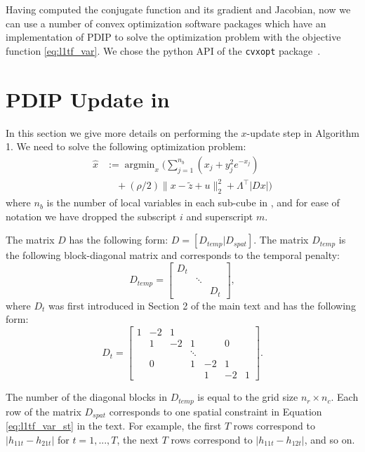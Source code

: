 \documentclass[letterpaper]{article} %
\newcommand{\citep}{\cite}
\DeclareMathOperator*{\argmin}{argmin}
\newcommand{\autoref}{\Cref}
\begin{document}
Having computed the conjugate function and its gradient and Jacobian,
now we can use a number of convex optimization software packages which
have an implementation of PDIP to solve the optimization problem with
the objective function \eqref{eq:l1tf_var}. We chose the python API of
the \texttt{cvxopt} package~\citep{andersen_cvxopt:_2013}. 




\section{PDIP Update in~\autoref{alg:conADMM}}
\label{sec:app_consADMM}

In this section we give more details on performing the $x$-update step in Algorithm 1. We need to solve the following optimization problem:
\begin{align}
\hat{x} &:=\argmin_{x} \bigg( \sum_{j=1}^{n_b} (x_j +
                y_j^2e^{-x_j})\\
  &\quad+ (\rho/2) \lVert x-\tilde{z} + u \lVert_2^2 + \Lambda^\top |D x| \bigg)
\label{eq:x_update_opt}
\end{align}
where $n_b$ is the number of local variables in each sub-cube in \autoref{fig:data_cube}, and for ease of notation we have dropped the subscript $i$ and superscript $m$. 

The matrix $D$ has the following form:  $D=[D_{temp}|D_{spat}]$. The matrix $D_{temp}$ is the following block-diagonal matrix and corresponds to the temporal penalty: 
\begin{equation}
D_{temp}=\begin{bmatrix}
D_t &  & \\ 
& \ddots & \\
&  & D_t
\end{bmatrix},
\label{eq:d_t_matrix}
\end{equation}
where $D_t$ was first introduced in Section 2 of the main text and has the following form:
\begin{equation}
 D_t=\begin{bmatrix}
 1 & -2 & 1 &  &  &  &\\ 
 & 1 & -2 & 1 &  &0  &\\ 
 &  &  & \ddots &  &  &\\ 
 & 0 & & 1 & -2 & 1 &  \\ 
 &  &  &   & 1 & -2 & 1 
 \end{bmatrix}.
\label{eq:d_matrix}
\end{equation}

The number of the diagonal blocks in $D_{temp}$ is equal to the grid
size $n_r \times n_c$. Each row of the matrix $D_{spat}$ corresponds
to one spatial constraint in Equation \eqref{eq:l1tf_var_st} in the
text. For example, the first $T$ rows correspond to
$|h_{11t}-h_{21t}|$ for $t=1,...,T$, the next $T$ rows correspond to
$|h_{11t}-h_{12t}|$, and so on.  
\end{document}
